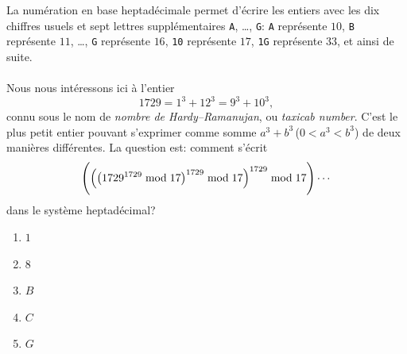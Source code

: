 %
%
La numération en base heptadécimale permet d'écrire les entiers avec les dix chiffres usuels et sept lettres supplémentaires %
\texttt{A}, \dots, \texttt{G}: \texttt{A} représente $10$, \texttt{B} représente $11$, \dots, \texttt{G} représente $16$, %
\texttt{10} représente $17$, \texttt{1G} représente $33$, et ainsi de suite. \\
\\
\noindent%
Nous nous intéressons ici à l'entier 
%
\begin{equation}
  1729 = 1^3 + 12^3 = 9^3 + 10^3,
\end{equation} 
%
connu sous le nom de \emph{nombre de Hardy--Ramanujan}, ou \emph{taxicab number}. C'est le plus petit entier pouvant s'exprimer 
comme somme $a^3 + b^3$\;\,($0 <a^3 <b^3$) de deux manières différentes. La question est: comment s'écrit%
%
\begin{equation*}
    \Biggl(\Bigl(\bigl(1729^{1729} \bmod{17}\bigr)^{1729} \bmod{17}\Bigr)^{1729} \bmod{17}\Biggr) \cdots
\end{equation*}
%
dans le système heptadécimal?
%
\begin{enumerate}
  \item $1$
  \item $8$
  \item $B$
  \item $C$
  \item $G$
\end{enumerate}
%
